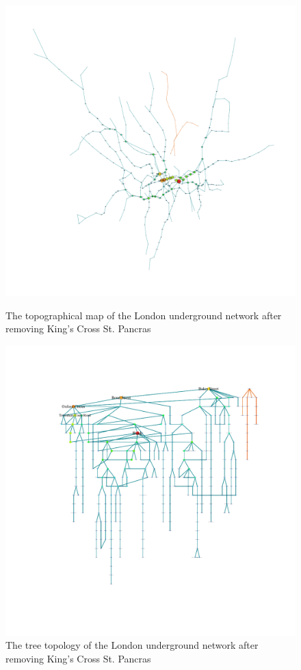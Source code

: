 \documentclass[a4paper,reqno,]{article}
\begin{document}
\begin{figure}[H]
\centering
\begin{minipage}[b]{0.49\textwidth}
\centering
    \captionsetup{width=.9\linewidth}
    \includegraphics[clip, trim=3cm 3cm 0.25cm 2cm,width=1\textwidth]{images/NW/1_1.pdf}
    \caption{The topographical map of the London underground network after removing King's Cross St. Pancras}\label{fig: 1_1}
\end{minipage}
\begin{minipage}[b]{0.5\textwidth}
\centering
    \captionsetup{width=.9\linewidth}
    \includegraphics[clip, trim=3cm 3cm 0.25cm 2cm,width=1\textwidth]{images/NW/1_2.pdf}
    \caption{The tree topology of the London underground network after removing King's Cross St. Pancras}\label{fig: 1_2}
\end{minipage}
\end{figure} 
\end{document}

